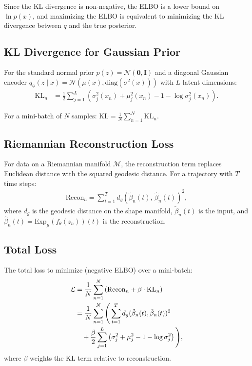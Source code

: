 \documentclass{article}
\begin{document}
Since the KL divergence is non-negative, the ELBO is a lower bound on $\ln p(x)$, and maximizing the ELBO is equivalent to minimizing the KL divergence between $q$ and the true posterior.

\subsection{KL Divergence for Gaussian Prior}
For the standard normal prior $p(z) = \mathcal{N}(\mathbf{0}, \mathbf{I})$ and a diagonal Gaussian encoder $q_\phi(z \mid x) = \mathcal{N}(\mu(x), \mathrm{diag}(\sigma^2(x)))$ with $L$ latent dimensions:
\begin{align}
\mathrm{KL}_n &= \frac{1}{2}\sum_{j=1}^{L}\left(\sigma_j^2(x_n) + \mu_j^2(x_n) - 1 - \log \sigma_j^2(x_n)\right).
\end{align}

For a mini-batch of $N$ samples: $\mathrm{KL} = \frac{1}{N}\sum_{n=1}^{N}\mathrm{KL}_n$.

\subsection{Riemannian Reconstruction Loss}
For data on a Riemannian manifold $\mathcal{M}$, the reconstruction term replaces Euclidean distance with the squared geodesic distance. For a trajectory with $T$ time steps:
\begin{align}
\mathrm{Recon}_n = \sum_{t=1}^{T} d_g\!\left(\tilde{\beta}_n(t),\, \hat{\beta}_n(t)\right)^2,
\end{align}
where $d_g$ is the geodesic distance on the shape manifold, $\tilde{\beta}_n(t)$ is the input, and $\hat{\beta}_n(t) = \mathrm{Exp}_\mu(f_\theta(z_n))(t)$ is the reconstruction.

\subsection{Total Loss}
The total loss to minimize (negative ELBO) over a mini-batch:
\begin{align}
\mathcal{L} &= \frac{1}{N}\sum_{n=1}^{N}\left(\mathrm{Recon}_n + \beta \cdot \mathrm{KL}_n\right) \notag \\
&= \frac{1}{N}\sum_{n=1}^{N}\Bigg(\sum_{t=1}^{T} d_g(\tilde{\beta}_n(t), \hat{\beta}_n(t))^2 \notag \\
&\quad + \frac{\beta}{2}\sum_{j=1}^{L}\left(\sigma_j^2 + \mu_j^2 - 1 - \log \sigma_j^2\right)\Bigg),
\end{align}
where $\beta$ weights the KL term relative to reconstruction.
\end{document}
